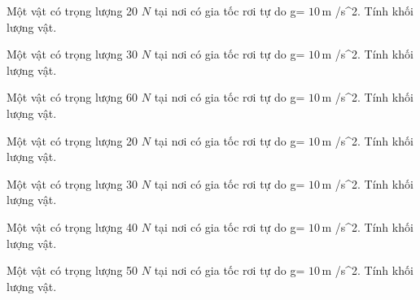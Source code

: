 \begin{ex}
Một vật có trọng lượng 20 $N$ tại nơi có gia tốc rơi tự do g= $10\,\text{m}$ /s^2. Tính khối lượng vật.
\end{ex}

\begin{ex}
Một vật có trọng lượng 30 $N$ tại nơi có gia tốc rơi tự do g= $10\,\text{m}$ /s^2. Tính khối lượng vật.
\end{ex}

\begin{bt}
Một vật có trọng lượng 60 $N$ tại nơi có gia tốc rơi tự do g= $10\,\text{m}$ /s^2. Tính khối lượng vật.
\end{bt}

\begin{bt}
Một vật có trọng lượng 20 $N$ tại nơi có gia tốc rơi tự do g= $10\,\text{m}$ /s^2. Tính khối lượng vật.
\end{bt}

\begin{bt}
Một vật có trọng lượng 30 $N$ tại nơi có gia tốc rơi tự do g= $10\,\text{m}$ /s^2. Tính khối lượng vật.
\end{bt}

\begin{bt}
Một vật có trọng lượng 40 $N$ tại nơi có gia tốc rơi tự do g= $10\,\text{m}$ /s^2. Tính khối lượng vật.
\end{bt}

\begin{bt}
Một vật có trọng lượng 50 $N$ tại nơi có gia tốc rơi tự do g= $10\,\text{m}$ /s^2. Tính khối lượng vật.
\end{bt}

